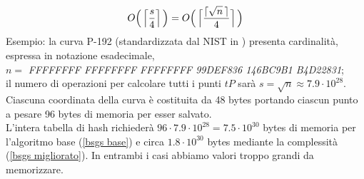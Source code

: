 \documentclass[a4paper,12pt]{tesiinfo}
\DeclarePairedDelimiter\ceil{\lceil}{\rceil}
\newcommand\ddfrac[2]{\frac{\displaystyle #1}{\displaystyle #2}}
\begin{document}
\begin{gather}
 O \Big (\, \Big \lceil \ddfrac{s}{4} \Big \rceil \, \Big ) = O \Big (\, \Big \lceil \ddfrac{\ceil{\sqrt{n}\,}}{4} \Big \rceil \, \Big ) 
 \label{bsgs migliorato}
\end{gather}
Esempio: la curva P-192 (standardizzata dal NIST in \cite{ec standard}) presenta cardinalit\`a, espressa in notazione esadecimale, 
\\
$n = $ \textit{FFFFFFFF FFFFFFFF FFFFFFFF 99DEF836 146BC9B1 B4D22831}; 
\\
il numero di operazioni per calcolare tutti i punti $tP$ sar\`a $s = \sqrt{n} \approx 7.9 \cdot 10^{28}$. Ciascuna coordinata della curva \`e costituita da 48 bytes portando ciascun punto a pesare 96 bytes di memoria per esser salvato. 
\\
L'intera tabella di hash richieder\`a $96 \cdot 7.9\cdot 10^{28} = 7.5 \cdot 10^{30}$ bytes di memoria per l'algoritmo base (\ref{bsgs base}) e circa $1.8 \cdot 10^{30}$ bytes mediante la complessit\`a (\ref{bsgs migliorato}). In entrambi i casi abbiamo valori troppo grandi da memorizzare.
%
%
%
%
%
%
%
%
%
%
%
%
\end{document}
